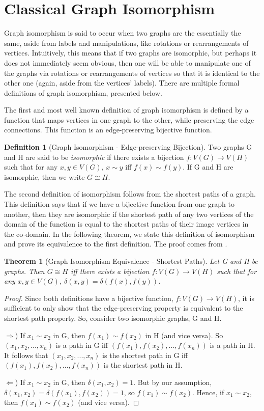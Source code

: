\documentclass[12pt]{article}
\newtheorem{Theorem}{Theorem}
\theoremstyle{definition}
\newtheorem{defn}{Definition}[section]
\theoremstyle{proposition}
\theoremstyle{lemma}
\begin{document}
\section{Classical Graph Isomorphism}
Graph isomorphism is said to occur when two graphs are the essentially the same, aside from labels and manipulations, like rotations or rearrangements of vertices. Intuitively, this means that if two graphs are isomorphic, but perhaps it does not immediately seem obvious, then one will be able to manipulate one of the graphs via rotations or rearrangements of vertices so that it is identical to the other one (again, aside from the vertices' labels). There are multiple formal definitions of graph isomorphism, presented below.



The first and most well known definition of graph isomorphism is defined by a function that maps vertices in one graph to the other, while preserving the edge connections. This function is an edge-preserving bijective function.
\begin{defn}[Graph Isomorphism - Edge-preserving Bijection]
Two graphs G and H are said to be \textit{isomorphic} if there exists a bijection $f:V(G) \to V(H)$ such that for any $x, y \in V(G)$, $x \sim y$ iff $f(x) \sim f(y)$. If G and H are isomorphic, then we write $G \cong H$.
\end{defn}

The second definition of isomorphism follows from the shortest paths of a graph. This definition says that if we have a bijective function from one graph to another, then they are isomorphic if the shortest path of any two vertices of the domain of the function is equal to the shortest paths of their image vertices in the co-domain. In the following theorem, we state this definition of isomorphism and prove its equivalence to the first definition. The proof comes from \cite{shortest}.

\begin{Theorem}[Graph Isomorphism Equivalence - Shortest Paths]
Let G and H be graphs. Then $G \cong H$ iff there exists a bijection $f:V(G) \to V(H)$ such that for any $x, y \in V(G)$, $\delta(x, y) = \delta(f(x), f(y))$.
\end{Theorem}

\begin{proof}
Since both definitions have a bijective function, $f:V(G) \to V(H)$, it is sufficient to only show that the edge-preserving property is equivalent to the shortest path property. So, consider two isomorphic graphs, G and H.

$\Rightarrow$) If $x_1 \sim x_2$ in G, then $f(x_1) \sim f(x_2)$ in H (and vice versa). So $(x_1, x_2, ..., x_n)$ is a path in G iff $(f(x_1), f(x_2), ..., f(x_n))$ is a path in H. It follows that $(x_1, x_2, ..., x_n)$ is the shortest path in G iff $(f(x_1), f(x_2), ..., f(x_n))$ is the shortest path in H.

$\Leftarrow$) If $x_1 \sim x_2$ in G, then $\delta(x_1, x_2) = 1$. But by our assumption, $\delta(x_1, x_2) = \delta(f(x_1), f(x_2)) = 1$, so $f(x_1) \sim f(x_2)$. Hence, if $x_1 \sim x_2$, then $f(x_1) \sim f(x_2)$ (and vice versa).
\end{proof}
\end{document}
